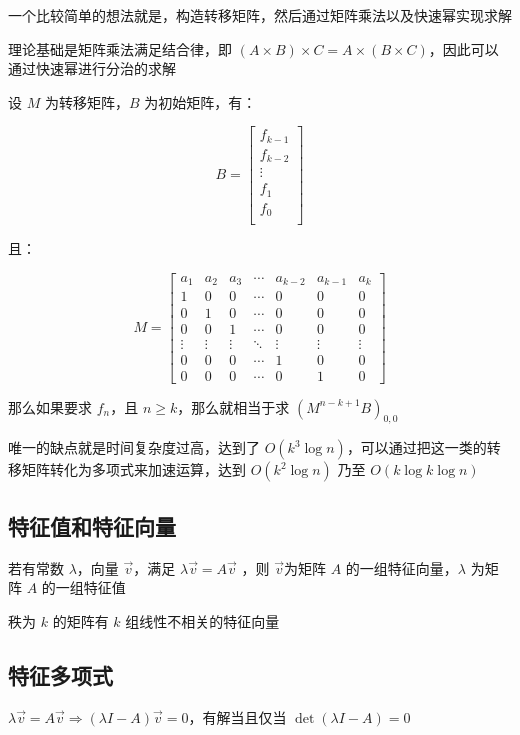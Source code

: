 \documentclass[UTF8]{article}
\begin{document}
一个比较简单的想法就是，构造转移矩阵，然后通过矩阵乘法以及快速幂实现求解

理论基础是矩阵乘法满足结合律，即 $(A \times B) \times C=A \times (B \times C)$，因此可以通过快速幂进行分治的求解

设 $M$ 为转移矩阵，$B$ 为初始矩阵，有：

$$
B=
\begin{bmatrix} 
    f_{k-1} \\
    f_{k-2} \\
    \vdots \\
    f_1 \\
    f_0 \\
\end{bmatrix}
$$

且：

$$
M=
\begin{bmatrix} 
    a _ 1 & a _ 2 & a _ 3 & \cdots & a _ {k - 2} & a _ {k - 1} & a _ k \\
    1 & 0 & 0 & \cdots & 0 & 0 & 0 \\
    0 & 1 & 0 & \cdots & 0 & 0 & 0 \\
    0 & 0 & 1 & \cdots & 0 & 0 & 0 \\
    \vdots & \vdots & \vdots & \ddots & \vdots & \vdots & \vdots \\
    0 & 0 & 0 & \cdots & 1 & 0 & 0 \\
    0 & 0& 0 & \cdots & 0 & 1 & 0
\end{bmatrix}
$$

那么如果要求 $f_{n}$，且 $n \ge k$，那么就相当于求 $(M^{n-k+1}B)_{0,0}$

唯一的缺点就是时间复杂度过高，达到了 $O(k^3 \log n)$，可以通过把这一类的转移矩阵转化为多项式来加速运算，达到 $O(k^2 \log n)$ 乃至 $O(k \log k \log n)$

\subsection{特征值和特征向量}

若有常数 $\lambda$，向量 $\vec v$，满足 $\lambda \vec v=A \vec v$ ，则 $\vec v$​ 为矩阵 $A$ 的一组特征向量，$\lambda$ 为矩阵 $A$ 的一组特征值

秩为 $k$ 的矩阵有 $k$ 组线性不相关的特征向量

\subsection{特征多项式}

$\lambda \vec v=A \vec v \Rightarrow (\lambda I-A)\vec v=0$，有解当且仅当 $\det(\lambda I-A)=0$
\end{document}
